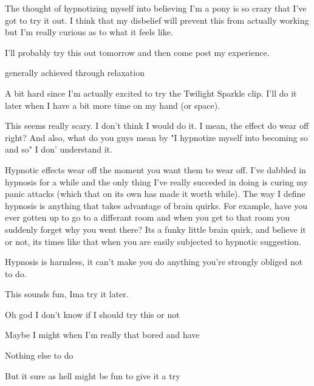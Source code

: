 \documentclass[ebook,12pt,oneside,openany]{memoir}
\begin{document}
\begin{tcolorbox}[title=Mutemutt]
\par{The thought of hypnotizing myself into believing I'm a pony is so crazy that I've got to try it out. I think that my disbelief will prevent this from actually working but I'm really curious as to what it feels like.}
\newline{}
\par{I'll probably try this out tomorrow and then come post my experience.}
\end{tcolorbox}
\begin{tcolorbox}[title=Xidphel]
\begin{tcolorbox}[title=Lord Bababa]
\par{generally achieved through relaxation}
\end{tcolorbox}
\par{A bit hard since I'm actually excited to try the Twilight Sparkle clip. I'll do it later when I have a bit more time on my hand (or space).}
\end{tcolorbox}
\begin{tcolorbox}[title=Two-of-Hearts]
\begin{tcolorbox}[title=SkyWind]
\par{This seems really scary. I don't think I would do it. I mean, the effect do wear off right? And also, what do you guys mean by  "I hypnotize myself into becoming so and so" I don' understand it. }
\end{tcolorbox}
\par{Hypnotic effects wear off the moment you want them to wear off. I've dabbled in hypnosis for a while and the only thing I've really succeded in doing is curing my panic attacks (which that on its own has made it worth while). The way I define hypnosis is anything that takes advantage of brain quirks. For example, have you ever gotten up to go to a differant room and when you get to that room you suddenly forget why you went there? Its a funky little brain quirk, and believe it or not, its times like that when you are easily subjected to hypnotic suggestion.}
\newline{}
\par{Hypnosis is harmless, it can't make you do anything you're strongly obliged not to do.}
\newline{}
\par{This sounds fun, Ima try it later.}
\end{tcolorbox}
\begin{tcolorbox}[title=Moog the Kvlt]
\par{Oh god I don't know if I should try this or not}
\par{Maybe I might when I'm really that bored and have}
\par{Nothing else to do}
\par{But it sure as hell might be fun to give it a try}
\end{tcolorbox}
\end{document}

